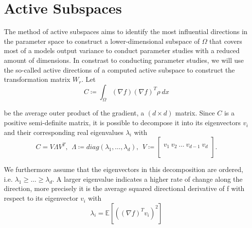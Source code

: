 \documentclass[
  a4paper,  %
  twoside,  %
  bibliography=totoc,
  headsepline,
  cleardoublepage=empty,
  parskip=half,
  draft=false
]{scrbook}
\begin{document}
\begin{mdframed}[style=style]
\begin{figure}[H]
\begin{subfigure}{.5\textwidth}
\end{subfigure}
\vspace{2.5mm}
\delimit
{}
\label{fig:trans_vis}
\end{figure}
\end{mdframed}

\section{Active Subspaces}
\label{sec:as}

The method of active subspaces \cite{CG15} aims to identify the most influential directions in the parameter space to construct a lower-dimensional subspace of $\Omega$ that covers most of a models output variance to conduct parameter studies with a reduced amount of dimensions.
In constrast to conducting parameter studies, we will use the so-called active directions of a computed active subspace to construct the transformation matrix $W_r$.
Let
\begin{equation}
C \coloneqq \int_{\Omega} (\nabla f) (\nabla f)^T \rho ~ dx
\label{eq:as_c}
\end{equation}

be the average outer product of the gradient, a $(d \times d)$ matrix.
Since $C$ is a positive semi-definite matrix, it is possible to decompose it into its eigenvectors $v_i$ and their corresponding real eigenvalues $\lambda_i$ with
\begin{equation}
C = V \Lambda V^T, ~~ \Lambda \coloneqq diag(\lambda_1, \dots, \lambda_d), ~~ V \coloneqq
  \begin{bmatrix}
  \\
    v_1 ~ v_2 ~ \dots ~ v_{d-1} ~ v_d\\
    \\
  \end{bmatrix}.
\nonumber
\end{equation}

We furthermore assume that the eigenvectors in this decomposition are ordered, i.e. $\lambda_1 \geq \dots \geq \lambda_d$.
A larger eigenvalue indicates a higher rate of change along the direction, more precisely it is the average squared directional derivative of f with respect to its eigenvector $v_i$ \cite{CG14} with
\begin{equation}
\lambda_i=\mathds{E}[((\nabla f)^T v_i)^2]
\label{eigenvalues}
\end{equation}
\end{document}
